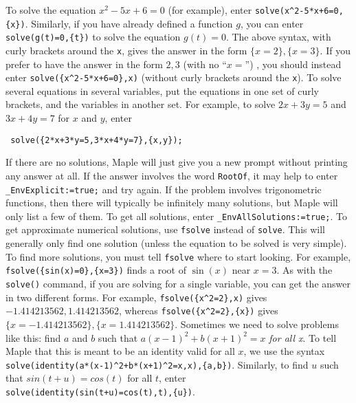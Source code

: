 \documentclass{amsart}
\begin{document}
\begin{itemize}
%
  To solve the equation $x^2-5x+6=0$ (for example), enter
  \verb~solve(x^2-5*x+6=0,{x})~.  Similarly, if you have
  already defined a function $g$, you can enter
  \verb~solve(g(t)=0,{t})~ to solve the equation $g(t)=0$. 
%
   The above syntax, with curly brackets around
   the \verb~x~, gives the answer in the form
   $\{x=2\},\{x=3\}$.  If you prefer to have the answer in
   the form $2,3$ (with no ``$x=$'') , you should instead enter
   \verb~solve({x^2-5*x+6=0},x)~ (without curly brackets
   around the \verb~x~). 
%
  To solve several equations in several variables, put the
  equations in one set of curly brackets, and the variables in another
  set.  For example, to solve $2x+3y=5$ and $3x+4y=7$ for $x$ and $y$,
  enter 
\begin{verbatim}
 solve({2*x+3*y=5,3*x+4*y=7},{x,y});
\end{verbatim}
%
  If there are no solutions, Maple will just give you a new
  prompt without printing any answer at all. 
%
  If the answer involves the word
  \verb~RootOf~, it may help to enter
  \verb~_EnvExplicit:=true;~ and try again.  
%
  If the problem involves trigonometric
  functions, then there will typically be infinitely many
  solutions, but Maple will only list a few of them.  To get
  all solutions, enter \verb~_EnvAllSolutions:=true;~. 
%
  To get approximate numerical solutions, use \verb~fsolve~
  instead of \verb~solve~.  This will generally only find one solution
  (unless the equation to be solved is very simple).  
%
  To find more solutions, you must tell \verb~fsolve~ where
  to start looking.  For example,
  \verb~fsolve({sin(x)=0},{x=3})~ finds a root of $\sin(x)$
  near $x=3$.  
%
  As with the \verb~solve()~ command, if you are
  solving for a single variable, you can get the answer in
  two different forms.  For example, \verb~fsolve({x^2=2},x)~
  gives $-1.414213562, 1.414213562$, whereas
  \verb~fsolve({x^2=2},{x})~ gives $\{x=-1.414213562\},
  \{x=1.414213562\}$. 
% 
  Sometimes we need to solve problems like
  this: find $a$ and $b$ such that $a(x-1)^2+b(x+1)^2=x$
  \emph{for all x}.  To tell Maple that this is meant to be
  an identity valid for all $x$, we use the syntax \\
  \verb~solve(identity(a*(x-1)^2+b*(x+1)^2=x,x),{a,b})~. 
  Similarly, to find $u$ such that $sin(t+u)=cos(t)$ for all
  $t$, enter
  \verb~solve(identity(sin(t+u)=cos(t),t),{u})~. 
\end{itemize}
\end{document}
